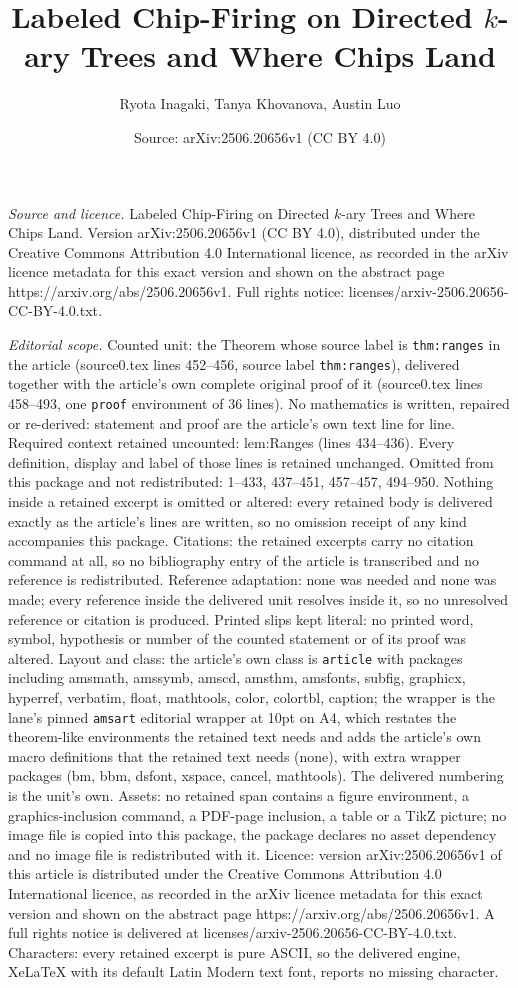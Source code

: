 \documentclass[10pt,a4paper]{amsart}
\title[Labeled Chip-Firing on Directed $k$-ary Trees and Where Chip]{Labeled Chip-Firing on Directed $k$-ary Trees and Where Chips Land}
\author{Ryota Inagaki, Tanya Khovanova, Austin Luo}
\date{Source: arXiv:2506.20656v1 (CC BY 4.0)}
\begin{document}
\maketitle

\noindent\emph{Source and licence.} Labeled Chip-Firing on Directed $k$-ary Trees and Where Chips Land. Version arXiv:2506.20656v1 (CC BY 4.0), distributed under the Creative Commons Attribution 4.0 International licence, as recorded in the arXiv licence metadata for this exact version and shown on the abstract page https://arxiv.org/abs/2506.20656v1. Full rights notice: licenses/arxiv-2506.20656-CC-BY-4.0.txt.\par\smallskip

\noindent\textit{Editorial scope.} Counted unit: the Theorem whose source label is \texttt{thm:ranges} in the article (source0.tex lines 452--456, source label \texttt{thm:ranges}), delivered together with the article's own complete original proof of it (source0.tex lines 458--493, one \texttt{proof} environment of 36 lines). No mathematics is written, repaired or re-derived: statement and proof are the article's own text line for line. Required context retained uncounted: lem:Ranges (lines 434--436). Every definition, display and label of those lines is retained unchanged. Omitted from this package and not redistributed: 1--433, 437--451, 457--457, 494--950. Nothing inside a retained excerpt is omitted or altered: every retained body is delivered exactly as the article's lines are written, so no omission receipt of any kind accompanies this package. Citations: the retained excerpts carry no citation command at all, so no bibliography entry of the article is transcribed and no reference is redistributed. Reference adaptation: none was needed and none was made; every reference inside the delivered unit resolves inside it, so no unresolved reference or citation is produced. Printed slips kept literal: no printed word, symbol, hypothesis or number of the counted statement or of its proof was altered. Layout and class: the article's own class is \texttt{article} with packages including amsmath, amssymb, amscd, amsthm, amsfonts, subfig, graphicx, hyperref, verbatim, float, mathtools, color, colortbl, caption; the wrapper is the lane's pinned \texttt{amsart} editorial wrapper at 10pt on A4, which restates the theorem-like environments the retained text needs and adds the article's own macro definitions that the retained text needs (none), with extra wrapper packages (bm, bbm, dsfont, xspace, cancel, mathtools). The delivered numbering is the unit's own. Assets: no retained span contains a figure environment, a graphics-inclusion command, a PDF-page inclusion, a table or a TikZ picture; no image file is copied into this package, the package declares no asset dependency and no image file is redistributed with it. Licence: version arXiv:2506.20656v1 of this article is distributed under the Creative Commons Attribution 4.0 International licence, as recorded in the arXiv licence metadata for this exact version and shown on the abstract page https://arxiv.org/abs/2506.20656v1. A full rights notice is delivered at licenses/arxiv-2506.20656-CC-BY-4.0.txt. Characters: every retained excerpt is pure ASCII, so the delivered engine, XeLaTeX with its default Latin Modern text font, reports no missing character.
\end{document}
